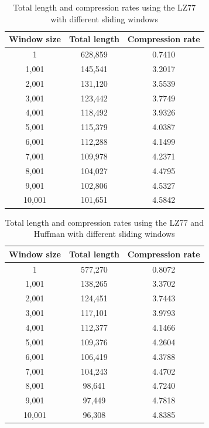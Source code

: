 \documentclass[]{template}
\begin{document}
    \begin{table}[ht]
        \centering
        \begin{tabular}{|c|c|c|}
            \hline
            Window size & Total length & Compression rate \\ \hline
            1 & 628,859 & 0.7410 \\ \hline
            1,001 & 145,541 & 3.2017 \\ \hline
            2,001 & 131,120 & 3.5539 \\ \hline
            3,001 & 123,442 & 3.7749 \\ \hline
            4,001 & 118,492 & 3.9326 \\ \hline
            5,001 & 115,379 & 4.0387 \\ \hline
            6,001 & 112,288 & 4.1499 \\ \hline
            7,001 & 109,978 & 4.2371 \\ \hline
            8,001 & 104,027 & 4.4795 \\ \hline
            9,001 & 102,806 & 4.5327 \\ \hline
            10,001 & 101,651 & 4.5842 \\ \hline
        \end{tabular}
        \caption{ Total length and compression rates using the LZ77 with different sliding windows}
        \label{tab:lz77}
    \end{table}

    \begin{table}[ht]
        \centering
        \begin{tabular}{|c|c|c|}
            \hline
            Window size & Total length & Compression rate \\ \hline
            1 & 577,270 & 0.8072 \\ \hline
            1,001 & 138,265 & 3.3702 \\ \hline
            2,001 & 124,451 & 3.7443 \\ \hline
            3,001 & 117,101 & 3.9793 \\ \hline
            4,001 & 112,377 & 4.1466 \\ \hline
            5,001 & 109,376 & 4.2604 \\ \hline
            6,001 & 106,419 & 4.3788 \\ \hline
            7,001 & 104,243 & 4.4702 \\ \hline
            8,001 & 98,641 & 4.7240 \\ \hline
            9,001 & 97,449 & 4.7818 \\ \hline
            10,001 & 96,308 & 4.8385 \\ \hline
        \end{tabular}
        \caption{ Total length and compression rates using the LZ77 and Huffman with different sliding windows}
        \label{tab:lz77_huffman}
    \end{table}
\end{document}
